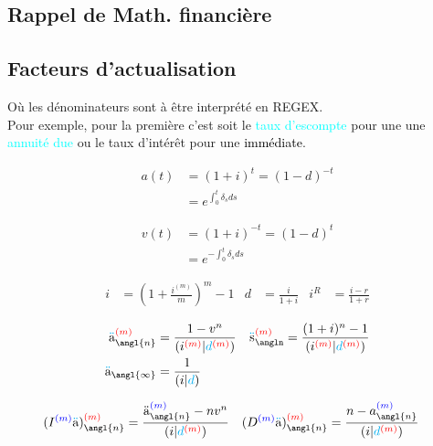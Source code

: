 \documentclass[10pt, french]{article}
\newcommand\cumlaut[2][black]{\stackon[.33ex]{#2}{\textcolor{#1}{\kern-.04ex.\kern-.2ex.}}}
\begin{document}
\footnotesize %
\begin{multicols*}{3} 	%
\section*{Rappel de Math. financière}
\subsection*{Facteurs d'actualisation}
Où les dénominateurs sont à être interprété en REGEX.\\
Pour exemple, pour la première c’est soit le \textcolor{cyan}{taux d'escompte} pour une une \textcolor{cyan}{annuité due} ou le taux d'intérêt pour une \textcolor{black}{immédiate}.

\setlength{\mathindent}{-1cm}
\begin{minipage}{0.5\columnwidth}
\begin{align*}
	a(t) 
		&= 	(1 + i)^{t} 
		= 	(1 - d)^{-t}		\\
	&= 	e^{\int_{0}^{t} \delta_s ds} %
\end{align*}
\end{minipage}
\begin{minipage}{0.5\columnwidth}
\begin{align*}
	v(t) 
		&= 	(1 + i)^{-t} 
		= 	(1 - d)^{t}	 \\
	&= 	e^{-\int_{0}^{t} \delta_s ds} %
\end{align*}
\end{minipage}
\begin{align*}
	i 	&= \left( 1 + \frac{i^{(m)}}{m} \right)^{m} - 1 &
	d	&= 	\frac{i}{1 + i} &
	i^{R}
		&=	\frac{i - r}{1 + r}
\end{align*}

\begin{align*}
	\cumlaut[cyan]{a}_{\angl{n}}^{\textcolor{red}{(m)}} 
		&= \frac{1 - v^n}{ (i^{\textcolor{red}{(m)}}{\color{black}|}{\color{cyan}d}^{\textcolor{red}{(m)}}{\color{black})}}	&
	\cumlaut[cyan]{s}_{\angln}^{\textcolor{red}{(m)}} 
		&=	\frac{(1+i)^{n} - 1}{(i^{\textcolor{red}{(m)}} | \textcolor{cyan}{d}^{\textcolor{red}{(m)}})}	\\
	\cumlaut[cyan]{a}_{\angl{\infty}} 
		&= \frac{1}{(i|\textcolor{cyan}{d})}
\end{align*}

\begin{align*}
	(I^{\textcolor{blue}{(m)}}\cumlaut[cyan]{a})_{\angl{n}}^{\textcolor{red}{(m)}} 
		&= \frac{\cumlaut[black]{a}_{\angl{n}}^{\textcolor{blue}{(m)}} - nv^n}{(i | \textcolor{cyan}{d}^{\textcolor{red}{(m)}})} &
	(D^{\textcolor{blue}{(m)}}\cumlaut[cyan]{a})_{\angl{n}}^{\textcolor{red}{(m)}} 
		&= \frac{n - a_{\angl{n}}^{\textcolor{blue}{(m)}}}{(i | \textcolor{cyan}{d}^{\textcolor{red}{(m)}})}
\end{align*}


\end{multicols*}
\end{document}
